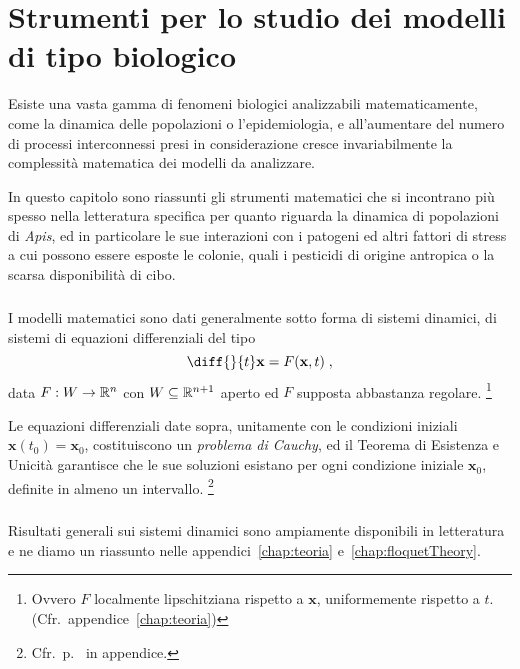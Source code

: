 \chapter[Strumenti per i modelli biologici]{Strumenti per lo studio dei modelli di tipo biologico}
\label{sec:ingredientiBioMat}

Esiste una vasta gamma di fenomeni biologici analizzabili matematicamente, come la dinamica delle popolazioni
o l'epidemiologia, e all'aumentare del numero di processi interconnessi presi in considerazione cresce
invariabilmente la complessità matematica dei modelli da analizzare.

In questo capitolo sono riassunti gli strumenti matematici che si incontrano più spesso nella letteratura
specifica per quanto riguarda la dinamica di popolazioni di \emph{Apis}, ed in particolare le sue interazioni
con i patogeni ed altri fattori di stress a cui possono essere esposte le colonie, quali i pesticidi di
origine antropica o la scarsa disponibilità di cibo.

\paragraph{}
I modelli matematici sono dati generalmente sotto forma di sistemi dinamici, \ie di sistemi di equazioni
differenziali del tipo
\begin{equation}
    \diff{}{t} \mathbf{x} = F( \mathbf{x}, t ) \; ,
    \label{eq:sistDin}
\end{equation}
data $F: W \to \mathbb{R}^n$ con $W \subseteq \mathbb{R}^{n+1}$ aperto ed $F$ supposta abbastanza regolare.%
\footnote{Ovvero $F$ localmente lipschitziana rispetto a $\mathbf{x}$, uniformemente rispetto a $t$.
(Cfr.~appendice~\ref{chap:teoria})}

Le equazioni differenziali date sopra, unitamente con le condizioni iniziali $\mathbf{x} (t_0) = \mathbf{x}_0$,
costituiscono un \emph{problema di Cauchy}, ed il Teorema di Esistenza e Unicità garantisce che le sue soluzioni
esistano per ogni condizione iniziale $\mathbf{x}_0$, definite in almeno un intervallo.
\footnote{Cfr.~p.~\pageref{eq:sdcGenerale} in appendice.}

\paragraph{}
Risultati generali sui sistemi dinamici sono ampiamente disponibili in letteratura e ne diamo un riassunto
nelle appendici~\ref{chap:teoria} e~\ref{chap:floquetTheory}.

